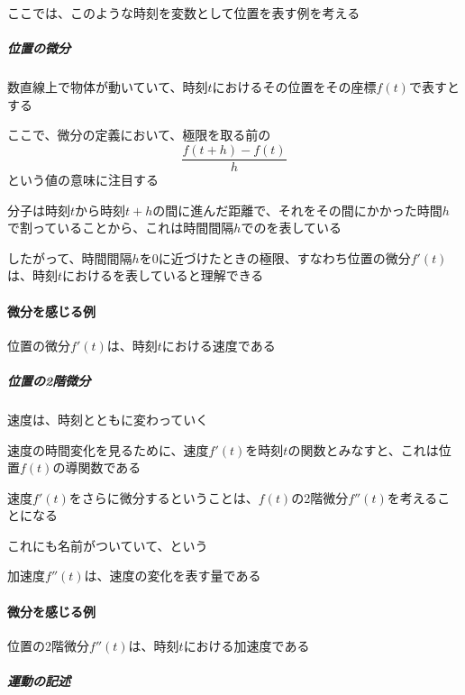\documentclass[../book_jiriki_calc]{subfiles}
\begin{document}
\br

ここでは、このような時刻を変数として位置を表す例を考える

\br

\subparagraph{位置の微分}

数直線上で物体が動いていて、時刻$t$におけるその位置をその座標$f(t)$で表すとする

\br

ここで、微分の定義において、極限を取る前の
\begin{equation}
  \frac{f(t+h)-f(t)}{h}
\end{equation}
という値の意味に注目する

\br

分子は時刻$t$から時刻$t+h$の間に進んだ距離で、それをその間にかかった時間$h$で割っていることから、これは時間間隔$h$でのを表している

\br

したがって、時間間隔$h$を$0$に近づけたときの極限、すなわち位置の微分$f'(t)$は、時刻$t$におけるを表していると理解できる

\br

\paragraph{微分を感じる例}

位置の微分$f'(t)$は、時刻$t$における速度である

\sectionline

\subparagraph{位置の2階微分}

速度は、時刻とともに変わっていく

速度の時間変化を見るために、速度$f'(t)$を時刻$t$の関数とみなすと、これは位置$f(t)$の導関数である

\br

速度$f'(t)$をさらに微分するということは、$f(t)$の2階微分$f''(t)$を考えることになる

これにも名前がついていて、という

加速度$f''(t)$は、速度の変化を表す量である

\br

\paragraph{微分を感じる例}

位置の2階微分$f''(t)$は、時刻$t$における加速度である

\sectionline

\subparagraph{運動の記述}
\end{document}
